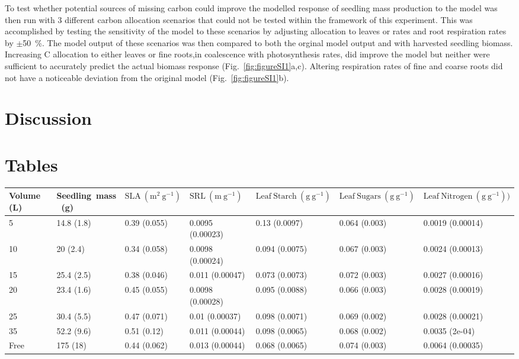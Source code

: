 \documentclass[a4paper]{article}\usepackage[]{graphicx}\usepackage[]{color}
\begin{document}
To test whether potential sources of missing carbon could improve the modelled response of seedling mass production to the model was then run with 3 different carbon allocation scenarios that could not be tested within the framework of this experiment. This was accomplished by testing the sensitivity of the model to these scenarios by adjusting allocation to leaves or rates and root respiration rates by $\pm$50~\%. The model output of these scenarios was then compared to both the orginal model output and with harvested seedling biomass.  Increasing C allocation to either leaves or fine roots,in coalescence with photosynthesis rates, did improve the model but neither were sufficient to accurately predict the actual biomass response  (Fig.~\ref{fig:figureSI1}a,c). Altering respiration rates of fine and coarse roots did not have a noticeable deviation from the original model (Fig.~\ref{fig:figureSI1}b).

\section*{Discussion}


\section*{Tables}



\begin{table}
\centering
\begin{tabular}{lllllll}
  \hline
	{Volume~(L)} & 	{Seedling~mass~(g)} & $\mathrm{SLA~(m^2~g^{-1})}$ & $\mathrm{SRL~(m~g^{-1})}$ & $\mathrm{Leaf~Starch~(g~g^{-1})}$ & $\mathrm{Leaf~Sugars~(g~g^{-1})}$ & $\mathrm{Leaf~Nitrogen~(g~g^{-1}))}$ \\ 
  \hline
5 & 14.8 (1.8) & 0.39 (0.055) & 0.0095 (0.00023) & 0.13 (0.0097) & 0.064 (0.003) & 0.0019 (0.00014) \\ 
  10 & 20 (2.4) & 0.34 (0.058) & 0.0098 (0.00024) & 0.094 (0.0075) & 0.067 (0.003) & 0.0024 (0.00013) \\ 
  15 & 25.4 (2.5) & 0.38 (0.046) & 0.011 (0.00047) & 0.073 (0.0073) & 0.072 (0.003) & 0.0027 (0.00016) \\ 
  20 & 23.4 (1.6) & 0.45 (0.055) & 0.0098 (0.00028) & 0.095 (0.0088) & 0.066 (0.003) & 0.0028 (0.00019) \\ 
  25 & 30.4 (5.5) & 0.47 (0.071) & 0.01 (0.00037) & 0.098 (0.0071) & 0.069 (0.002) & 0.0028 (0.00021) \\ 
  35 & 52.2 (9.6) & 0.51 (0.12) & 0.011 (0.00044) & 0.098 (0.0065) & 0.068 (0.002) & 0.0035 (2e-04) \\ 
  Free & 175 (18) & 0.44 (0.062) & 0.013 (0.00044) & 0.068 (0.0065) & 0.074 (0.003) & 0.0064 (0.00035) \\ 
   \hline
\end{tabular}
\label{table:Table1}
\end{table}
\end{document}
